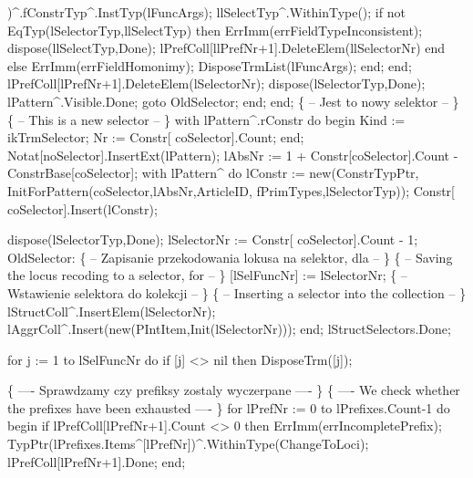                                                 )^.fConstrTyp^.InstTyp(lFuncArgs);
                     llSelectTyp^.WithinType();
                     if not EqTyp(lSelectorTyp,llSelectTyp) then
                        ErrImm(errFieldTypeInconsistent);
                     dispose(llSelectTyp,Done);
                     lPrefColl[llPrefNr+1].DeleteElem(llSelectorNr)
                  end
                  else ErrImm(errFieldHomonimy);
                  DisposeTrmList(lFuncArgs);
               end;
            end;
            lPrefColl[lPrefNr+1].DeleteElem(lSelectorNr);
            dispose(lSelectorTyp,Done);
            lPattern^.Visible.Done;
            goto OldSelector;
         end;
      end;
      \{ -- Jest to nowy selektor -- \}
      \{ -- This is a new selector -- \}
      with lPattern^.rConstr do
      begin Kind := ikTrmSelector; Nr :=  Constr[ coSelector].Count; end;
      Notat[noSelector].InsertExt(lPattern);
      lAbsNr :=  1 + Constr[coSelector].Count - ConstrBase[coSelector];
      with lPattern^ do
         lConstr :=  new(ConstrTypPtr,
                         InitForPattern(coSelector,lAbsNr,ArticleID,
                                        fPrimTypes,lSelectorTyp));
      Constr[ coSelector].Insert(lConstr);
      
      dispose(lSelectorTyp,Done);
      lSelectorNr :=  Constr[ coSelector].Count - 1;
      OldSelector:
         \{ -- Zapisanie przekodowania lokusa na selektor, dla  -- \}
         \{ -- Saving the locus recoding to a selector, for  -- \}
         [lSelFuncNr] := lSelectorNr;
      \{ -- Wstawienie selektora do kolekcji -- \}
      \{ -- Inserting a selector into the collection -- \}
      lStructColl^.InsertElem(lSelectorNr);
      lAggrColl^.Insert(new(PIntItem,Init(lSelectorNr)));
   end;
   lStructSelectors.Done;
   
   for j := 1 to lSelFuncNr do
      if [j] <> nil then
         DisposeTrm([j]);
   
   \{ ---- Sprawdzamy czy prefiksy zostaly wyczerpane ---- \}
   \{ ---- We check whether the prefixes have been exhausted ---- \}
   for lPrefNr := 0 to lPrefixes.Count-1 do
   begin
      if lPrefColl[lPrefNr+1].Count <> 0 then ErrImm(errIncompletePrefix);
      TypPtr(lPrefixes.Items^[lPrefNr])^.WithinType(ChangeToLoci);
      lPrefColl[lPrefNr+1].Done;
   end;
   

